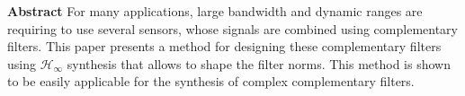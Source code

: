 
\textbf{Abstract}
For many applications, large bandwidth and dynamic ranges are requiring to use several sensors, whose signals are combined using complementary filters.
This paper presents a method for designing these complementary filters using $\mathcal{H}_\infty$ synthesis that allows to shape the filter norms.
This method is shown to be easily applicable for the synthesis of complex complementary filters.
